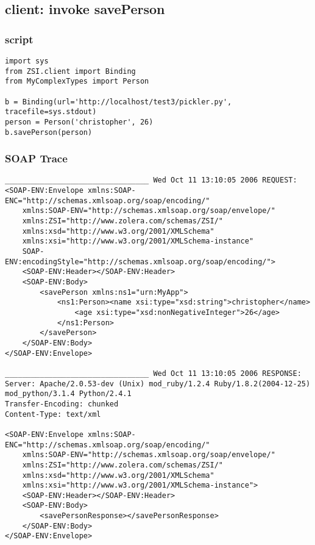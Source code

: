 \subsection{client: invoke savePerson} 
\subsubsection{script}
\begin{verbatim}
import sys
from ZSI.client import Binding
from MyComplexTypes import Person

b = Binding(url='http://localhost/test3/pickler.py', tracefile=sys.stdout)
person = Person('christopher', 26)
b.savePerson(person)
\end{verbatim} 

\subsubsection{SOAP Trace}
\begin{verbatim}
_________________________________ Wed Oct 11 13:10:05 2006 REQUEST:
<SOAP-ENV:Envelope xmlns:SOAP-ENC="http://schemas.xmlsoap.org/soap/encoding/" 
	xmlns:SOAP-ENV="http://schemas.xmlsoap.org/soap/envelope/" 
	xmlns:ZSI="http://www.zolera.com/schemas/ZSI/" 
	xmlns:xsd="http://www.w3.org/2001/XMLSchema" 
	xmlns:xsi="http://www.w3.org/2001/XMLSchema-instance" 
	SOAP-ENV:encodingStyle="http://schemas.xmlsoap.org/soap/encoding/">
	<SOAP-ENV:Header></SOAP-ENV:Header>
	<SOAP-ENV:Body>
		<savePerson xmlns:ns1="urn:MyApp">
			<ns1:Person><name xsi:type="xsd:string">christopher</name>
				<age xsi:type="xsd:nonNegativeInteger">26</age>
			</ns1:Person>
		</savePerson>
	</SOAP-ENV:Body>
</SOAP-ENV:Envelope>

_________________________________ Wed Oct 11 13:10:05 2006 RESPONSE:
Server: Apache/2.0.53-dev (Unix) mod_ruby/1.2.4 Ruby/1.8.2(2004-12-25) 
mod_python/3.1.4 Python/2.4.1
Transfer-Encoding: chunked
Content-Type: text/xml

<SOAP-ENV:Envelope xmlns:SOAP-ENC="http://schemas.xmlsoap.org/soap/encoding/" 
	xmlns:SOAP-ENV="http://schemas.xmlsoap.org/soap/envelope/" 
	xmlns:ZSI="http://www.zolera.com/schemas/ZSI/" 
	xmlns:xsd="http://www.w3.org/2001/XMLSchema" 
	xmlns:xsi="http://www.w3.org/2001/XMLSchema-instance">
	<SOAP-ENV:Header></SOAP-ENV:Header>
	<SOAP-ENV:Body>
		<savePersonResponse></savePersonResponse>
	</SOAP-ENV:Body>
</SOAP-ENV:Envelope>

\end{verbatim} 

